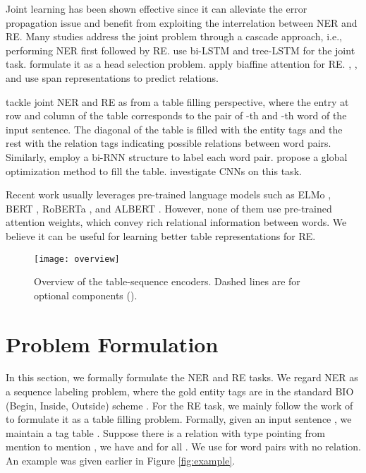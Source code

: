 \documentclass[11pt,a4paper]{article}
\begin{document}
Joint learning has been shown effective since it can alleviate the error propagation issue and benefit from exploiting the interrelation between NER and RE.
Many studies address the joint problem through a cascade approach, i.e., performing NER first followed by RE.
\citet{miwa2016end} use bi-LSTM \cite{graves2013speech} and tree-LSTM \cite{tai2015improved} for the joint task.
\citet{bekoulis2018adversarial,bekoulis2018joint} formulate it as a head selection problem.
\citet{nguyen2019end} apply biaffine attention \cite{dozat2016deep} for RE.
\citet{luan2019general}, \citet{dixit2019span}, and \citet{wadden2019entity} use span representations to predict relations.

\citet{miwa2014modeling} tackle joint NER and RE as from a table filling perspective,
where the entry at row  and column  of the table corresponds to the pair of -th and -th word of the input sentence.
The diagonal of the table is filled with the entity tags and the rest with the relation tags indicating possible relations between word pairs.
Similarly, \citet{gupta2016table} employ a bi-RNN structure to label each word pair.
\citet{zhang2017end} propose a global optimization method to fill the table.
\citet{tran2019neural} investigate CNNs on this task.

Recent work \cite{luan2019general,dixit2019span,wadden2019entity,li2019entity,eberts2019span}
usually leverages pre-trained language models such as ELMo \cite{elmo}, BERT \cite{bert}, RoBERTa \cite{roberta}, and ALBERT \cite{albert}.
However, none of them use pre-trained attention weights, which convey rich relational information between words.
We believe it can be useful for learning better table representations for RE.

 

\begin{figure}[t!]
    \centering

    \texttt{[image: overview]}

    \caption{
        Overview of the table-sequence encoders.
        Dashed lines are for optional components ().}
    \label{fig:network}

\end{figure}

\section{Problem Formulation}

In this section, we formally formulate the  NER and RE tasks.
We regard NER as a sequence labeling problem, where the gold entity tags  are in the standard BIO (Begin, Inside, Outside) scheme \cite{sang1999representing,ratinov2009design}.
For the RE task, we mainly follow the work of \citet{miwa2014modeling} to formulate it as a table filling problem.
Formally, given an input sentence  ,
we maintain a tag table .
Suppose there is a relation with type  pointing from mention  to mention ,
we have  and  for all .
We use  for word pairs with no relation.
An example was given earlier in Figure \ref{fig:example}.
\end{document}
